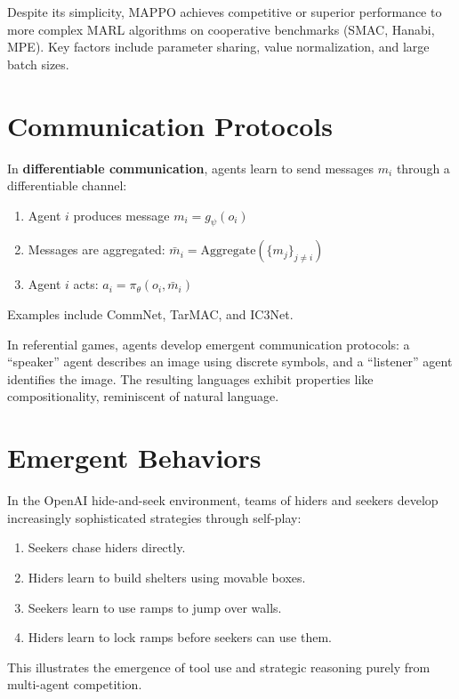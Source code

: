 \begin{proposition}
Despite its simplicity, MAPPO achieves competitive or superior performance
to more complex MARL algorithms on cooperative benchmarks (SMAC,
Hanabi, MPE). Key factors include parameter sharing, value normalization,
and large batch sizes.
\end{proposition}

\section{Communication Protocols}
\label{sec:marl:communication}

\begin{definition}
In \textbf{differentiable communication}, agents learn to send messages
$m_i$ through a differentiable channel:
\begin{enumerate}
    \item Agent $i$ produces message $m_i = g_\psi(o_i)$
    \item Messages are aggregated: $\bar{m}_i = \text{Aggregate}(\{m_j\}_{j \neq i})$
    \item Agent $i$ acts: $a_i = \pi_\theta(o_i, \bar{m}_i)$
\end{enumerate}
Examples include CommNet, TarMAC, and IC3Net.
\end{definition}

\begin{example}
In referential games, agents develop emergent communication protocols:
a ``speaker'' agent describes an image using discrete symbols, and a
``listener'' agent identifies the image. The resulting languages exhibit
properties like compositionality, reminiscent of natural language.
\end{example}

\section{Emergent Behaviors}
\label{sec:marl:emergent}

\begin{example}
In the OpenAI hide-and-seek environment, teams of hiders and seekers
develop increasingly sophisticated strategies through self-play:
\begin{enumerate}
    \item Seekers chase hiders directly.
    \item Hiders learn to build shelters using movable boxes.
    \item Seekers learn to use ramps to jump over walls.
    \item Hiders learn to lock ramps before seekers can use them.
\end{enumerate}
This illustrates the emergence of tool use and strategic reasoning
purely from multi-agent competition.
\end{example}

